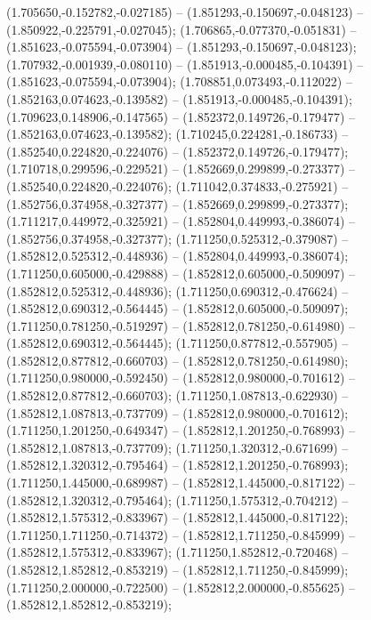  (1.705650,-0.152782,-0.027185) -- (1.851293,-0.150697,-0.048123) -- (1.850922,-0.225791,-0.027045);
 (1.706865,-0.077370,-0.051831) -- (1.851623,-0.075594,-0.073904) -- (1.851293,-0.150697,-0.048123);
 (1.707932,-0.001939,-0.080110) -- (1.851913,-0.000485,-0.104391) -- (1.851623,-0.075594,-0.073904);
 (1.708851,0.073493,-0.112022) -- (1.852163,0.074623,-0.139582) -- (1.851913,-0.000485,-0.104391);
 (1.709623,0.148906,-0.147565) -- (1.852372,0.149726,-0.179477) -- (1.852163,0.074623,-0.139582);
 (1.710245,0.224281,-0.186733) -- (1.852540,0.224820,-0.224076) -- (1.852372,0.149726,-0.179477);
 (1.710718,0.299596,-0.229521) -- (1.852669,0.299899,-0.273377) -- (1.852540,0.224820,-0.224076);
 (1.711042,0.374833,-0.275921) -- (1.852756,0.374958,-0.327377) -- (1.852669,0.299899,-0.273377);
 (1.711217,0.449972,-0.325921) -- (1.852804,0.449993,-0.386074) -- (1.852756,0.374958,-0.327377);
 (1.711250,0.525312,-0.379087) -- (1.852812,0.525312,-0.448936) -- (1.852804,0.449993,-0.386074);
 (1.711250,0.605000,-0.429888) -- (1.852812,0.605000,-0.509097) -- (1.852812,0.525312,-0.448936);
 (1.711250,0.690312,-0.476624) -- (1.852812,0.690312,-0.564445) -- (1.852812,0.605000,-0.509097);
 (1.711250,0.781250,-0.519297) -- (1.852812,0.781250,-0.614980) -- (1.852812,0.690312,-0.564445);
 (1.711250,0.877812,-0.557905) -- (1.852812,0.877812,-0.660703) -- (1.852812,0.781250,-0.614980);
 (1.711250,0.980000,-0.592450) -- (1.852812,0.980000,-0.701612) -- (1.852812,0.877812,-0.660703);
 (1.711250,1.087813,-0.622930) -- (1.852812,1.087813,-0.737709) -- (1.852812,0.980000,-0.701612);
 (1.711250,1.201250,-0.649347) -- (1.852812,1.201250,-0.768993) -- (1.852812,1.087813,-0.737709);
 (1.711250,1.320312,-0.671699) -- (1.852812,1.320312,-0.795464) -- (1.852812,1.201250,-0.768993);
 (1.711250,1.445000,-0.689987) -- (1.852812,1.445000,-0.817122) -- (1.852812,1.320312,-0.795464);
 (1.711250,1.575312,-0.704212) -- (1.852812,1.575312,-0.833967) -- (1.852812,1.445000,-0.817122);
 (1.711250,1.711250,-0.714372) -- (1.852812,1.711250,-0.845999) -- (1.852812,1.575312,-0.833967);
 (1.711250,1.852812,-0.720468) -- (1.852812,1.852812,-0.853219) -- (1.852812,1.711250,-0.845999);
 (1.711250,2.000000,-0.722500) -- (1.852812,2.000000,-0.855625) -- (1.852812,1.852812,-0.853219);

